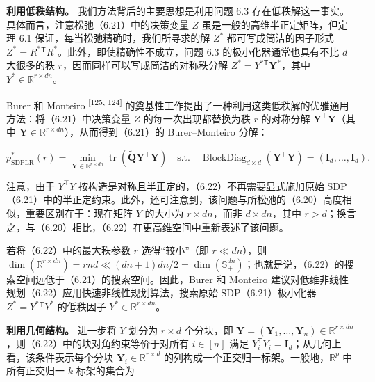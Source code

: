 \textbf{利用低秩结构。} 我们方法背后的主要思想是利用问题 6.3 存在低秩解这一事实。具体而言，注意松弛（6.21）中的决策变量 $Z$ 虽是一般的高维半正定矩阵，但定理 6.1 保证，每当松弛精确时，我们所寻求的解 $Z ^ { * }$ 都可写成简洁的因子形式 $Z ^ { * } = R ^ { * } { } ^ { \mathsf { T } } R ^ { * }$。此外，即使精确性不成立，问题 6.3 的极小化器通常也具有不比 $d$ 大很多的秩 $r$，因而同样可以写成简洁的对称秩分解 $Z ^ { * } = Y ^ { * \mathsf { T } } \mathbf { Y } ^ { * }$，其中 $Y ^ { * } \in \mathbb { R } ^ { r \times d n }$。

Burer 和 Monteiro \textsuperscript{[125, 124]} 的奠基性工作提出了一种利用这类低秩解的优雅通用方法：将（6.21）中决策变量 $Z$ 的每一次出现都替换为秩 $r$ 的对称分解 $\pmb { Y } ^ { \top } \pmb { Y }$（其中 $\pmb { Y } \in \mathbb { R } ^ { r \times d n }$），从而得到（6.21）的 Burer--Monteiro 分解：

\begin{equation}
p _ {\mathrm{SDPLR}} ^ {*} (r) = \min _ {\boldsymbol {Y} \in \mathbb {R} ^ {r \times d n}} \operatorname{tr} \left(\tilde {\boldsymbol {Q}} \boldsymbol {Y} ^ {\top} \boldsymbol {Y}\right) \quad \text {s.t.} \quad \operatorname{BlockDiag} _ {d \times d} (\boldsymbol {Y} ^ {\top} \boldsymbol {Y}) = (\mathbf {I} _ {d}, \ldots , \mathbf {I} _ {d}).\tag{6.22}
\end{equation}

注意，由于 $Y ^ { \top } Y$ 按构造是对称且半正定的，（6.22）不再需要显式施加原始 SDP（6.21）中的半正定约束。此外，还可注意到，该问题与所松弛的（6.20）高度相似，重要区别在于：现在矩阵 $Y$ 的大小为 $r \times dn$，而非 $d \times d n$，其中 $r > d$；换言之，与（6.20）相比，（6.22）在更高维空间中重新表述了该问题。

若将（6.22）中的最大秩参数 $r$ 选得“较小”（即 $r \ll d n$），则 $\dim ( \mathbb { R } ^ { r \times d n } ) = r n d \ll ( d n + 1 ) d n / 2 = \dim ( \mathbb { S } _ { + } ^ { d n } )$；也就是说，（6.22）的搜索空间远低于（6.21）的搜索空间。因此，Burer 和 Monteiro 建议对低维非线性规划（6.22）应用快速非线性规划算法，搜索原始 SDP（6.21）极小化器 $Z ^ { * } = Y ^ { * } { } ^ { \mathsf { T } } Y ^ { * }$ 的低秩因子 $Y ^ { * } \in \mathbb { R } ^ { r \times d n }$。

\textbf{利用几何结构。} 进一步将 $Y$ 划分为 $r \times d$ 个分块，即 $\pmb { Y } = ( \pmb { Y } _ { 1 } , \dots , \pmb { Y } _ { n } ) \in \mathbb { R } ^ { r \times d n }$，则（6.22）中的块对角约束等价于对所有 $i \in [ n ]$ 满足 $Y _ { i } ^ { \mathsf { T } } Y _ { i } = \mathbf { I } _ { d }$；从几何上看，该条件表示每个分块 $\pmb { Y } _ { i } \in \mathbb { R } ^ { r \times d }$ 的列构成一个正交归一标架。一般地，$\mathbb { R } ^ { p }$ 中所有正交归一 $k$-标架的集合为

